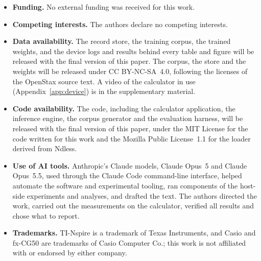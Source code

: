 \documentclass[10pt]{article}
\newif\ifdeanonymized
\newcommand{\Theauthor}{\ifdeanonymized The author\else The authors\fi}
\begin{document}
\begin{itemize}
\setlength{\itemsep}{1pt}
\item \textbf{Funding.} No external funding was received for this work.\ifdeanonymized{} The author
funded the project personally.\fi
\item \textbf{Competing interests.} \Theauthor{} \ifdeanonymized declares\else declare\fi{} no
competing interests.
\item \textbf{Data availability.} The record store, the training corpus, the trained weights, and the
device logs and results behind every table and figure will be released with the final version of
this paper. The corpus, the store and the weights will be released under CC BY-NC-SA~4.0, following
the licenses of the OpenStax source text.\ifdeanonymized\else{} A video of the calculator in use
(Appendix~\ref{app:device}) is in the supplementary material.\fi
\item \textbf{Code availability.} The code, including the calculator application, the inference
engine, the corpus generator and the evaluation harness, will be released with the final version of
this paper, under the MIT License for the code written for this work and the Mozilla Public
License~1.1 for the loader derived from Ndless.
\ifdeanonymized
\item \textbf{Author contributions.} The author initiated and directed the project, oversaw all
agentic workflows, verified all of the results, carried out the measurements on the calculator, revised
the full text and personally funded the project. The author takes full responsibility for the work.
\fi
\item \textbf{Use of AI tools.} Anthropic's Claude models, Claude Opus~5 and Claude Opus~5.5, used
through the Claude Code command-line interface, helped automate the software and experimental tooling,
ran components of the host-side experiments and analyses, and drafted the text. \Theauthor{} directed
the work, carried out the measurements on the calculator, verified all results and chose what to report.
\item \textbf{Trademarks.} TI-Nspire is a trademark of Texas Instruments, and Casio and fx-CG50 are
trademarks of Casio Computer Co.; this work is not affiliated with or endorsed by either company.
\end{itemize}




\appendix
\end{document}
